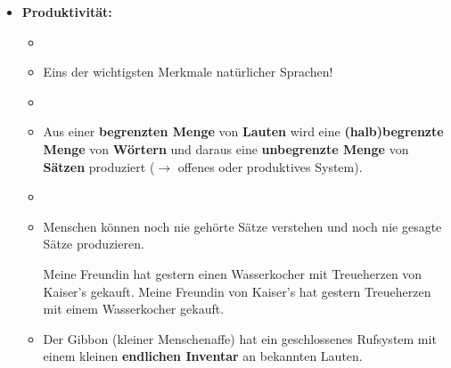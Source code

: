\begin{frame}

\begin{itemize}
	\item<1-> \textbf{Produktivität:}
	
	\begin{itemize}
		\item[]				
		\item<1-> Eins der wichtigsten Merkmale natürlicher Sprachen!
		\item[]
		\item<2-> Aus einer \textbf{begrenzten Menge} von \textbf{Lauten} wird eine \textbf{(halb)begrenzte Menge} von \textbf{Wörtern} und daraus eine \textbf{unbegrenzte Menge} von \textbf{Sätzen} produziert ($\rightarrow$ offenes oder produktives System).
		\item[]
		\item<2-> Menschen können noch nie gehörte Sätze verstehen und noch nie gesagte Sätze produzieren.


\pause

\ea Meine Freundin hat gestern einen Wasserkocher mit Treueherzen von Kaiser's gekauft.
\ex Meine Freundin von Kaiser's hat gestern Treueherzen mit einem Wasserkocher gekauft.
\z
				
	\item<4-> Der Gibbon (kleiner Menschenaffe) hat ein geschlossenes Rufsystem mit einem kleinen \textbf{endlichen Inventar} an bekannten Lauten. 
	
	\end{itemize}
	
\end{itemize}

\end{frame}



